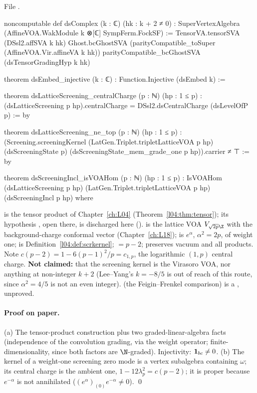 \noindent File .
\begin{leancode}
noncomputable def dsComplex (k : ℂ) (hk : k + 2 ≠ 0) :
    SuperVertexAlgebra (AffineVOA.WakModule k ⊗[ℂ] SympFerm.FockSF) :=
  TensorVA.tensorSVA (DSsl2.affSVA k hk) Ghost.bcGhostSVA
    (parityCompatible_toSuper (AffineVOA.Vir.affineVA k hk)) parityCompatible_bcGhostSVA
    (dsTensorGradingHyp k hk)

theorem dsEmbed_injective (k : ℂ) : Function.Injective (dsEmbed k) :=

theorem dsLatticeScreening_centralCharge (p : ℕ) (hp : 1 ≤ p) :
    (dsLatticeScreening p hp).centralCharge = DSsl2.dsCentralCharge (dsLevelOfP p) := by

theorem dsLatticeScreening_ne_top (p : ℕ) (hp : 1 ≤ p) :
    (Screening.screeningKernel (LatGen.Triplet.tripletLatticeVOA p hp)
      (dsScreeningState p) (dsScreeningState_mem_grade_one p hp)).carrier ≠ ⊤ := by

theorem dsScreeningIncl_isVOAHom (p : ℕ) (hp : 1 ≤ p) :
    IsVOAHom (dsLatticeScreening p hp) (LatGen.Triplet.tripletLatticeVOA p hp)
      (dsScreeningIncl p hp) where
\end{leancode}

\begin{dictionary}
 is the tensor product of Chapter~\ref{ch:L04} (Theorem~\ref{l04:thm:tensor}); its
hypothesis , open there, is discharged here ().
 is the lattice VOA $V_{\sqrt{2p}\Z}$ with the background-charge conformal vector
(Chapter~\ref{ch:L18});  is $e^{\alpha}$, $\alpha^2 = 2p$, of weight one;
 is Definition~\ref{l04:def:scrkernel};  $= p-2$;
 preserves vacuum and all products. Note $c(p-2) = 1-6(p-1)^2/p = c_{1,p}$, the logarithmic
$(1,p)$ central charge. \textbf{Not claimed:} that the screening kernel is the Virasoro VOA, nor anything at
non-integer $k+2$ (Lee--Yang's $k=-8/5$ is out of reach of this route, since $\alpha^2 = 4/5$ is not an even
integer).  (the Feigin--Frenkel comparison) is a , unproved.
\end{dictionary}

\paragraph{Proof on paper.} (a) The tensor-product construction plus two graded-linear-algebra facts
(independence of the convolution grading, via the weight operator; finite-dimensionality, since both factors
are $\N$-graded). Injectivity: $\mathbf{1}_{bc}\ne0$. (b) The kernel of a weight-one screening zero mode is a
vertex subalgebra containing $\omega$; its central charge is the ambient one, $1-12\lambda_p^2 = c(p-2)$; it is
proper because $e^{-\alpha}$ is not annihilated ($(e^\alpha)_{(0)}e^{-\alpha}\ne0$). \qed

